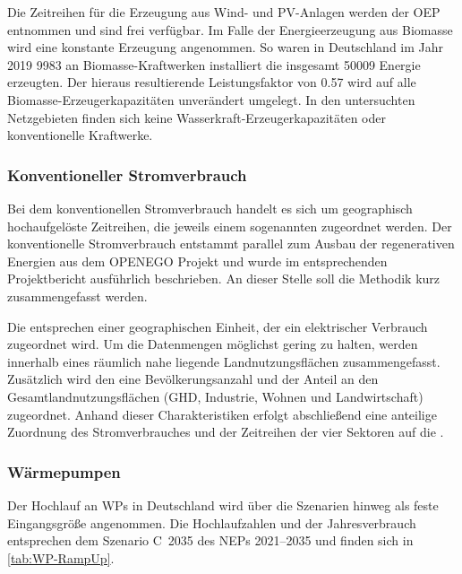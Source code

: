 

Die Zeitreihen für die Erzeugung aus Wind- und \gls{PV}-Anlagen werden der \gls{OEP} \cite{OEP} entnommen und sind frei verfügbar.
Im Falle der Energieerzeugung aus Biomasse wird eine konstante Erzeugung angenommen.
So waren in Deutschland im Jahr \num{2019} \SI{9983}{\mw} an Biomasse-Kraftwerken installiert die insgesamt \SI{50009}{\gwh} Energie erzeugten. \cite{BMWi2020}
Der hieraus resultierende Leistungsfaktor von \num{0.57} wird auf alle Biomasse-Erzeugerkapazitäten unverändert umgelegt.
In den untersuchten Netzgebieten finden sich keine Wasserkraft-Erzeugerkapazitäten oder konventionelle Kraftwerke.


\subsubsection{Konventioneller Stromverbrauch}

Bei dem konventionellen Stromverbrauch handelt es sich um geographisch hochaufgelöste Zeitreihen, die jeweils einem sogenannten \Lastgebiet zugeordnet werden.
Der konventionelle Stromverbrauch entstammt parallel zum Ausbau der regenerativen Energien aus dem \gls{OPENEGO} Projekt und wurde im entsprechenden Projektbericht \cite{Mueller2019} ausführlich beschrieben.
An dieser Stelle soll die Methodik kurz zusammengefasst werden.\medskip

Die \Lastgebiete entsprechen einer geographischen Einheit, der ein elektrischer Verbrauch zugeordnet wird.
Um die Datenmengen möglichst gering zu halten, werden innerhalb eines \Lastgebietes räumlich nahe liegende Landnutzungsflächen zusammengefasst.
Zusätzlich wird den \Lastgebieten eine Bevölkerungsanzahl und der Anteil an den Gesamtlandnutzungsflächen (\gls{GHD}, Industrie, Wohnen und Landwirtschaft) zugeordnet.
Anhand dieser Charakteristiken erfolgt abschließend eine anteilige Zuordnung des Stromverbrauches und der Zeitreihen der vier Sektoren auf die \Lastgebietedot.


\subsubsection{Wärmepumpen}

Der Hochlauf an \glspl{WP} in Deutschland wird über die Szenarien hinweg als feste Eingangsgröße angenommen.
Die Hochlaufzahlen und der Jahresverbrauch entsprechen dem Szenario C~\num{2035} des \glspl{NEP} \numrange[range-phrase=~{--}~]{2021}{2035} \cite{BNetzA2020} und finden sich in \autoref{tab:WP-RampUp}.

